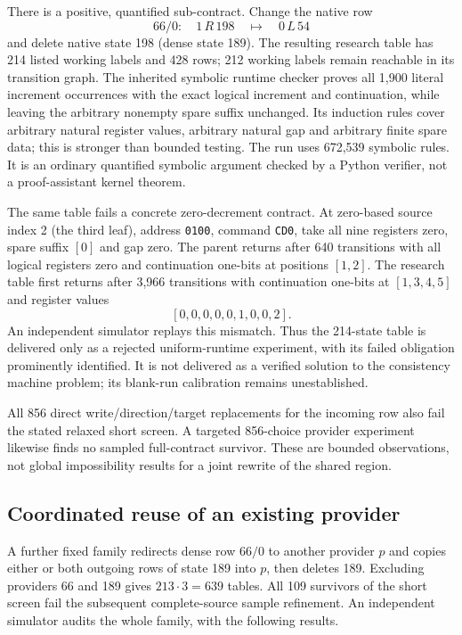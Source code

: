 There is a positive, quantified sub-contract. Change the native row
\[
 66/0:\quad 1\,R\,198\quad\longmapsto\quad 0\,L\,54
\]
and delete native state 198 (dense state 189). The resulting research table has
214 listed working labels and 428 rows; 212 working labels remain reachable
in its transition graph. The inherited symbolic runtime checker proves
all 1,900 literal increment occurrences with the exact logical increment and
continuation, while leaving the arbitrary nonempty spare suffix unchanged.
Its induction rules cover arbitrary natural register values, arbitrary natural
gap and arbitrary finite spare data; this is stronger than bounded testing.
The run uses 672,539 symbolic rules. It is an ordinary quantified symbolic
argument checked by a Python verifier, not a proof-assistant kernel theorem.

The same table fails a concrete zero-decrement contract. At zero-based source
index 2 (the third leaf),
address \texttt{0100}, command \texttt{CD0}, take all nine registers zero,
spare suffix $[0]$ and gap zero. The parent returns after 640 transitions with
all logical registers zero and continuation one-bits at positions $[1,2]$.
The research table first returns after 3,966 transitions with continuation
one-bits at $[1,3,4,5]$ and register values
\[
 [0,0,0,0,0,1,0,0,2].
\]
An independent simulator replays this mismatch. Thus the 214-state table is
delivered only as a rejected uniform-runtime experiment, with its failed
obligation prominently identified. It is not delivered as a verified solution
to the consistency machine problem; its blank-run calibration remains
unestablished.

All 856 direct write/direction/target replacements for the incoming row also
fail the stated relaxed short screen. A targeted 856-choice provider experiment
likewise finds no sampled full-contract survivor. These are bounded
observations, not global impossibility results for a joint rewrite of the
shared region.

\subsection{Coordinated reuse of an existing provider}

A further fixed family redirects dense row $66/0$ to another provider $p$ and
copies either or both outgoing rows of state 189 into $p$, then deletes 189.
Excluding providers 66 and 189 gives $213\cdot3=639$ tables. All 109 survivors
of the short screen fail the subsequent complete-source sample refinement.
An independent simulator audits the whole family, with the following results.

